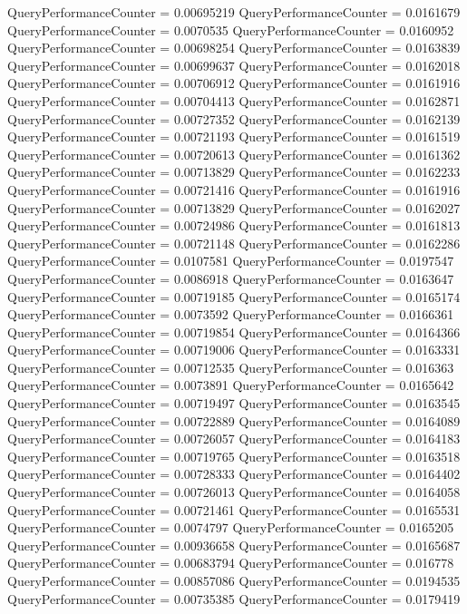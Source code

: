 \documentclass[9pt]{article}
\theoremstyle{plain}
\theoremstyle{definition}
\theoremstyle{remark}
\numberwithin{equation}{section}
\begin{document}
QueryPerformanceCounter  =  0.00695219
QueryPerformanceCounter  =  0.0161679
QueryPerformanceCounter  =  0.0070535
QueryPerformanceCounter  =  0.0160952
QueryPerformanceCounter  =  0.00698254
QueryPerformanceCounter  =  0.0163839
QueryPerformanceCounter  =  0.00699637
QueryPerformanceCounter  =  0.0162018
QueryPerformanceCounter  =  0.00706912
QueryPerformanceCounter  =  0.0161916
QueryPerformanceCounter  =  0.00704413
QueryPerformanceCounter  =  0.0162871
QueryPerformanceCounter  =  0.00727352
QueryPerformanceCounter  =  0.0162139
QueryPerformanceCounter  =  0.00721193
QueryPerformanceCounter  =  0.0161519
QueryPerformanceCounter  =  0.00720613
QueryPerformanceCounter  =  0.0161362
QueryPerformanceCounter  =  0.00713829
QueryPerformanceCounter  =  0.0162233
QueryPerformanceCounter  =  0.00721416
QueryPerformanceCounter  =  0.0161916
QueryPerformanceCounter  =  0.00713829
QueryPerformanceCounter  =  0.0162027
QueryPerformanceCounter  =  0.00724986
QueryPerformanceCounter  =  0.0161813
QueryPerformanceCounter  =  0.00721148
QueryPerformanceCounter  =  0.0162286
QueryPerformanceCounter  =  0.0107581
QueryPerformanceCounter  =  0.0197547
QueryPerformanceCounter  =  0.0086918
QueryPerformanceCounter  =  0.0163647
QueryPerformanceCounter  =  0.00719185
QueryPerformanceCounter  =  0.0165174
QueryPerformanceCounter  =  0.0073592
QueryPerformanceCounter  =  0.0166361
QueryPerformanceCounter  =  0.00719854
QueryPerformanceCounter  =  0.0164366
QueryPerformanceCounter  =  0.00719006
QueryPerformanceCounter  =  0.0163331
QueryPerformanceCounter  =  0.00712535
QueryPerformanceCounter  =  0.016363
QueryPerformanceCounter  =  0.0073891
QueryPerformanceCounter  =  0.0165642
QueryPerformanceCounter  =  0.00719497
QueryPerformanceCounter  =  0.0163545
QueryPerformanceCounter  =  0.00722889
QueryPerformanceCounter  =  0.0164089
QueryPerformanceCounter  =  0.00726057
QueryPerformanceCounter  =  0.0164183
QueryPerformanceCounter  =  0.00719765
QueryPerformanceCounter  =  0.0163518
QueryPerformanceCounter  =  0.00728333
QueryPerformanceCounter  =  0.0164402
QueryPerformanceCounter  =  0.00726013
QueryPerformanceCounter  =  0.0164058
QueryPerformanceCounter  =  0.00721461
QueryPerformanceCounter  =  0.0165531
QueryPerformanceCounter  =  0.0074797
QueryPerformanceCounter  =  0.0165205
QueryPerformanceCounter  =  0.00936658
QueryPerformanceCounter  =  0.0165687
QueryPerformanceCounter  =  0.00683794
QueryPerformanceCounter  =  0.016778
QueryPerformanceCounter  =  0.00857086
QueryPerformanceCounter  =  0.0194535
QueryPerformanceCounter  =  0.00735385
QueryPerformanceCounter  =  0.0179419
\end{document}
